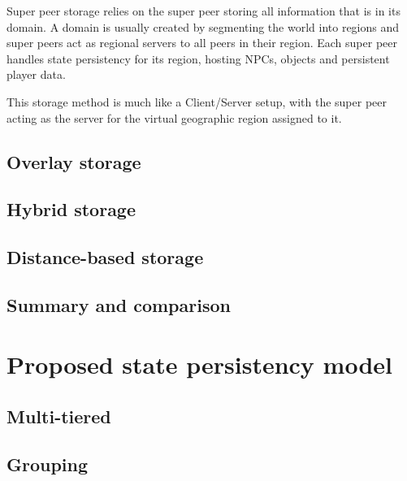 \documentclass[10pt,a4paper,journal,cspaper,compsoc]{IEEEtran}
\begin{document}
Super peer storage relies on the super peer storing all information that is in its domain. A domain is usually created by segmenting the world into
regions and super peers act as regional servers to all peers in their region. Each super peer handles state persistency for its region, hosting NPCs,
objects and persistent player data.

This storage method is much like a Client/Server setup, with the super peer acting as the server for the virtual geographic region assigned to it.


\subsection{Overlay storage}



\subsection{Hybrid storage}



\subsection{Distance-based storage}



\subsection{Summary and comparison}

\section{Proposed state persistency model}
\label{proposed_model}

\subsection{Multi-tiered}

\subsection{Grouping}
\end{document}
